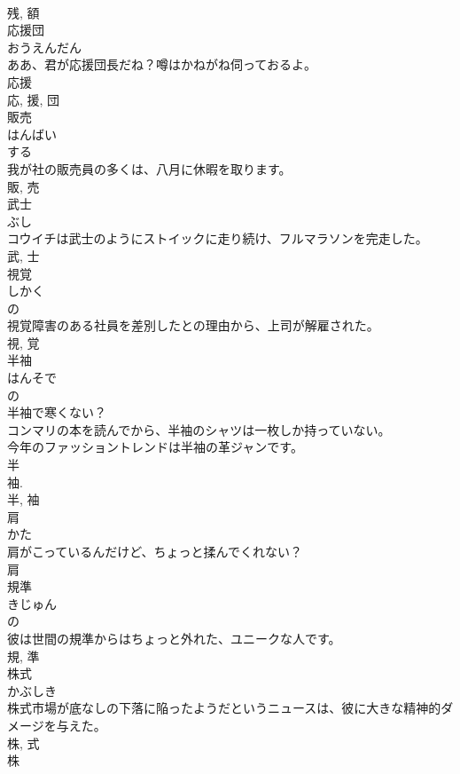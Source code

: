 \documentclass[8pt]{extreport}
\begin{document}
\begin{CJK}{UTF8}{min}
\\	残, 額	
\\	応援団	
\\	おうえんだん	
\\	ああ、君が応援団長だね？噂はかねがね伺っておるよ。	
\\	応援 
\\	応, 援, 団	
\\	販売	
\\	はんばい	
\\	する 
\\	我が社の販売員の多くは、八月に休暇を取ります。	
\\	販, 売	
\\	武士	
\\	ぶし	
\\	コウイチは武士のようにストイックに走り続け、フルマラソンを完走した。	
\\	武, 士	
\\	視覚	
\\	しかく	
\\	の 
\\	視覚障害のある社員を差別したとの理由から、上司が解雇された。	
\\	視, 覚	
\\	半袖	
\\	はんそで	
\\	の 
\\	半袖で寒くない？	
\\	コンマリの本を読んでから、半袖のシャツは一枚しか持っていない。	
\\	今年のファッショントレンドは半袖の革ジャンです。	
\\	半 
\\	袖. 
\\	半, 袖	
\\	肩	
\\	かた	
\\	肩がこっているんだけど、ちょっと揉んでくれない？	
\\	肩	
\\	規準	
\\	きじゅん	
\\	の 
\\	彼は世間の規準からはちょっと外れた、ユニークな人です。	
\\	規, 準	
\\	株式	
\\	かぶしき	
\\	株式市場が底なしの下落に陥ったようだというニュースは、彼に大きな精神的ダメージを与えた。	
\\	株, 式	
\\	株	

\end{CJK}
\end{document}
